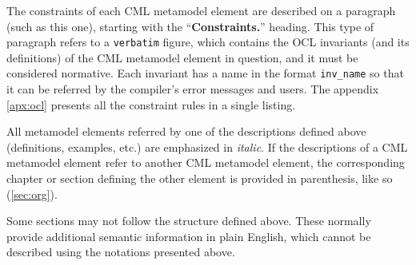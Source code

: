 \begin{constraints}
The constraints of each CML metamodel element are described
on a paragraph (such as this one),
starting with the ``\textbf{Constraints.}'' heading.
This type of paragraph refers to a \verb+verbatim+ figure,
which contains the OCL \cite{ocl} invariants
(and its definitions)
of the CML metamodel element in question,
and it must be considered normative.
Each invariant has a name in the format \verb+inv_name+
so that it can be referred by the compiler's error messages
and users.
The appendix \ref{apx:ocl} presents all the constraint rules
in a single listing.
\end{constraints}

All metamodel elements referred by one of the descriptions defined above
(definitions, examples, etc.)
are emphasized in \emph{italic}.
If the descriptions of a CML metamodel element refer to another CML metamodel element,
the corresponding chapter or section defining the other element
is provided in parenthesis, like so (\ref{sec:org}).

Some sections may not follow the structure defined above.
These normally provide additional semantic information in plain English,
which cannot be described using the notations presented above.
